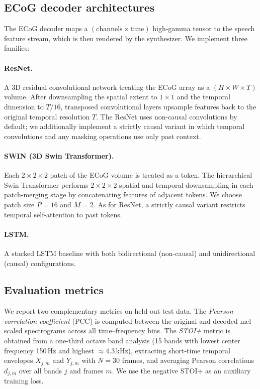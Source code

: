 \documentclass[11pt]{article}
\begin{document}
\subsection{ECoG decoder architectures}
The ECoG decoder maps a $(\text{channels} \times \text{time})$ high-gamma tensor to the speech feature stream, which is then rendered by the synthesizer. We implement three families:

\paragraph{ResNet.} A 3D residual convolutional network treating the ECoG array as a $(H \times W \times T)$ volume. After downsampling the spatial extent to $1\times 1$ and the temporal dimension to $T/16$, transposed convolutional layers upsample features back to the original temporal resolution $T$. The ResNet uses non-causal convolutions by default; we additionally implement a strictly causal variant in which temporal convolutions and any masking operations use only past context.

\paragraph{SWIN (3D Swin Transformer).} Each $2\times 2 \times 2$ patch of the ECoG volume is treated as a token. The hierarchical Swin Transformer \cite{liu2021swin,liu2022video} performs $2\times 2\times 2$ spatial and temporal downsampling in each patch-merging stage by concatenating features of adjacent tokens. We choose patch size $P=16$ and $M=2$. As for ResNet, a strictly causal variant restricts temporal self-attention to past tokens.

\paragraph{LSTM.} A stacked LSTM \cite{hochreiter1997long} baseline with both bidirectional (non-causal) and unidirectional (causal) configurations.

\subsection{Evaluation metrics}
We report two complementary metrics on held-out test data. The \emph{Pearson correlation coefficient} (PCC) is computed between the original and decoded mel-scaled spectrograms across all time--frequency bins. The \emph{STOI+} metric \cite{taal2011algorithm,graetzer2021comparison} is obtained from a one-third octave band analysis (15 bands with lowest center frequency 150\,Hz and highest $\approx 4.3$\,kHz), extracting short-time temporal envelopes $X_{j,m}$ and $Y_{j,m}$ with $N=30$ frames, and averaging Pearson correlations $d_{j,m}$ over all bands $j$ and frames $m$. We use the negative STOI+ as an auxiliary training loss.
\end{document}
